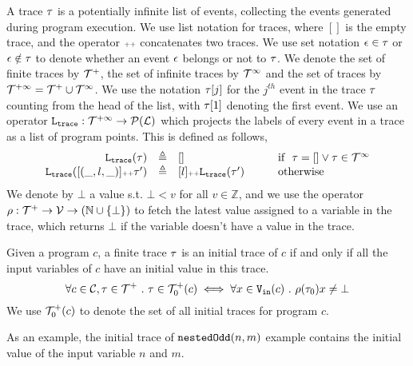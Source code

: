 A trace $\mathtt{\tau}$ is a potentially infinite list of events, 
collecting the events generated  during program execution. 
We use list notation for traces, where $[]$ is the empty trace, and
the operator ${\scriptscriptstyle ++}$ concatenates two traces. We use set notation $\mathtt{\epsilon} \in \mathtt{\tau}$ or $\mathtt{\epsilon} \notin \mathtt{\tau}$ to denote whether an event $\mathtt{\epsilon}$ belongs or not to $\mathtt{\tau}$.
{
We denote the set of finite traces by $\mathcal{T}^{+}$, the set of infinite traces by $\mathcal{T}^{\infty}$ and the set of traces by $\mathcal{T}^{+\infty} = \mathcal{T}^{+} \cup \mathcal{T}^{\infty}$.
}
We use the notation $\mathtt{\tau}[j]$ for the $j^{th}$ event in the trace $\mathtt{\tau}$ counting from the head of the list, with $\mathtt{\tau}[1]$ denoting the first event.
We use an operator $\mathtt{L}_{\mathtt{{trace}}}: \mathcal{T}^{+\infty} \to \mathcal{P}{(\mathcal{L})}$ which projects the labels of every event in a trace as a list of program points. This is defined as follows,
\[
\begin{array}{rcll}
\mathtt{L}_{\mathtt{{trace}}}(\mathtt{\tau}) &\triangleq & [] &\qquad  \mbox{if}~~ \mathtt{\tau} = [] \lor \mathtt{\tau} \in \mathcal{T}^{\infty}
\\ 
\mathtt{L}_{\mathtt{{trace}}}([(\_, l, \_)] {\scriptscriptstyle ++} \mathtt{\tau}') &\triangleq & [l] {\scriptscriptstyle ++} \mathtt{L}_{\mathtt{{trace}}}(\mathtt{\tau}') &\qquad  \mbox{otherwise}
\end{array}
\]
%
We denote by $\bot$ a value s.t. $\bot < v $ for all $v \in \mathbb{Z}$, and we use the operator $\rho: {\mathcal{T}^{+}} \to \mathcal{V} \to(\mathbb{N} \cup \{\bot\})$  to fetch the latest value assigned to a variable in the trace, which returns $\bot$ if the variable doesn't have a value in the trace.
    \begin{defn}
        \label{def:initial_trace}
        Given a program $c$, a finite trace $\mathtt{\tau}$ is an initial trace of $c$ if and only if all the input variables of $c$ have an initial value in this trace.
        \[
        \forall c \in \mathcal{C}, \mathtt{\tau} \in \mathcal{T}^{+} ~.~ \mathtt{\tau} \in \mathcal{T}^{+}_0(c) \iff 
        \forall x \in {\ensuremath{\mathtt{V_{\mathtt{in}}}}}(c) ~.~ \rho(\mathtt{\tau}_0) x \neq \bot
        \]
        We use $\mathcal{T}^{+}_0(c)$ to denote the set of all initial traces for program $c$.
        \end{defn}
        As an example, the initial trace of $\mathtt{nestedOdd}(n, m)$ example contains the initial value of the input variable $n$ and $m$.
\\



